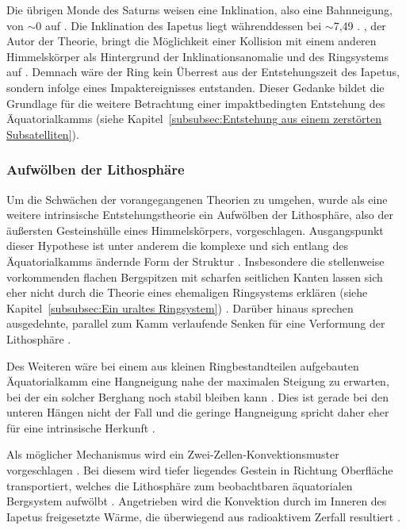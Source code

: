 \documentclass[a4paper,11pt]{article}
\newcommand{\mysubsubsection}[1]{\subsubsection{#1}\label{subsubsec:#1}}
\begin{document}
Die übrigen Monde des Saturns weisen eine Inklination, also eine Bahnneigung, von $\sim$0\degree{} auf \parencite[4]{Ip_2006}.
Die Inklination des Iapetus liegt währenddessen bei $\sim$7,49\degree{} \parencite[180]{Castillo-Rogez_2007}.
\citeauthor{Ip_2006}, der Autor der Theorie, bringt die Möglichkeit einer Kollision mit einem anderen Himmelskörper als Hintergrund
der Inklinationsanomalie und des Ringsystems auf \parencite[4]{Ip_2006}.
Demnach wäre der Ring kein Überrest aus der Entstehungszeit des Iapetus, sondern infolge eines Impaktereignisses entstanden.
Dieser Gedanke bildet die Grundlage für die weitere Betrachtung einer impaktbedingten Entstehung des Äquatorialkamms
(siehe Kapitel~\ref{subsubsec:Entstehung aus einem zerstörten Subsatelliten}).





\mysubsubsection{Aufwölben der Lithosphäre}

Um die Schwächen der vorangegangenen Theorien zu umgehen,
wurde als eine weitere intrinsische Entstehungstheorie ein Aufwölben der Lithosphäre,
also der äußersten Gesteinshülle eines Himmelskörpers, vorgeschlagen.
Ausgangspunkt dieser Hypothese ist unter anderem die komplexe und
sich entlang des Äquatorialkamms ändernde Form der Struktur \parencite[365]{Giese_2008}.
Insbesondere die stellenweise vorkommenden flachen Bergspitzen mit scharfen seitlichen Kanten
lassen sich eher nicht durch die Theorie eines ehemaligen Ringsystems erklären
(siehe Kapitel~\ref{subsubsec:Ein uraltes Ringsystem}) \parencite[365]{Giese_2008}.
Darüber hinaus sprechen ausgedehnte, parallel zum Kamm verlaufende Senken
für eine Verformung der Lithosphäre \parencite[364]{Giese_2008}.

Des Weiteren wäre bei einem aus kleinen Ringbestandteilen aufgebauten Äquatorialkamm eine Hangneigung
nahe der maximalen Steigung zu erwarten, bei der ein solcher Berghang noch stabil bleiben kann \parencite[364]{Giese_2008}.
Dies ist gerade bei den unteren Hängen nicht der Fall und die geringe Hangneigung spricht daher eher 
für eine intrinsische Herkunft \parencite[364]{Giese_2008}.

Als möglicher Mechanismus wird ein Zwei-Zellen-Konvektionsmuster vorgeschlagen \parencite[64, 65, 68]{Czechowski_2008}.
Bei diesem wird tiefer liegendes Gestein in Richtung Oberfläche transportiert, welches die Lithosphäre zum beobachtbaren
äquatorialen Bergsystem aufwölbt \parencite[64, 65, 68]{Czechowski_2008}.
Angetrieben wird die Konvektion durch im Inneren des Iapetus freigesetzte Wärme,
die überwiegend aus radioaktivem Zerfall resultiert \parencite[64]{Czechowski_2008}.
\end{document}
